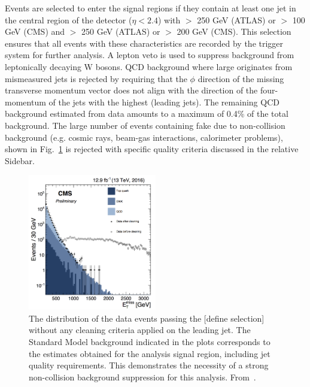 

Events are selected to enter the \MET signal regions if they contain at least one jet in the central region of the detector ($\eta<2.4$) with \pt $>$ 250 GeV (ATLAS) or \pt $>$ 100 GeV (CMS) and \MET $>$ 250 GeV (ATLAS) or \MET $>$ 200 GeV (CMS). This selection ensures that all events with these characteristics are recorded by the trigger system for further analysis. A lepton veto is used to suppress background from leptonically decaying W bosons. 
QCD background where large \MET originates from mismeasured jets is rejected by requiring that the $\phi$ direction of the missing transverse momentum vector does not align with the direction of the four-momentum of the jets with the highest \pt (leading jets). The remaining QCD background estimated from data amounts to a maximum of 0.4\% of the total background. The large number of events containing fake \MET due to non-collision background (e.g. cosmic rays, beam-gas interactions, calorimeter problems), shown in Fig.~\ref{fig:fakeMET} is rejected with specific quality criteria discussed in the relative Sidebar.%

\begin{figure}[!htpb]
\includegraphics[width=0.5\textwidth]{figures/FakeMETTemp.png}
\caption{The \MET distribution of the data events passing the [define selection] without any cleaning criteria applied on the leading jet. The Standard Model background indicated in the plots corresponds to the estimates obtained for the analysis signal region, including jet quality requirements. 
This demonstrates the necessity of a strong non-collision background suppression for this analysis. From~\cite{ToBeFound}.}
\label{fig:fakeMET}
\end{figure}

